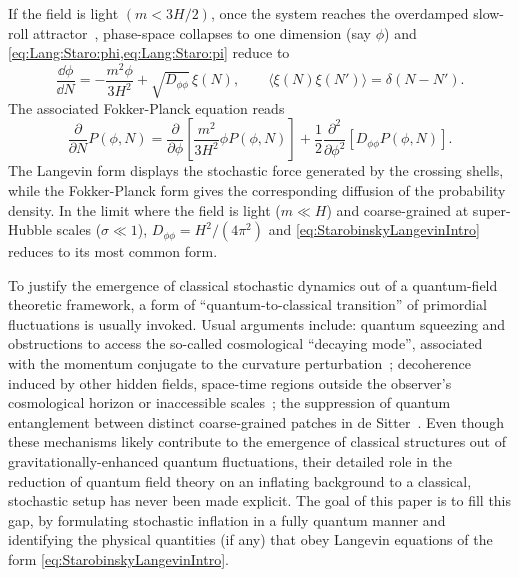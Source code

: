 \documentclass{article}
\numberwithin{equation}{section}
\begin{document}
If the field is light $(m<3H/2)$, once the system reaches the overdamped slow-roll attractor~\cite{grain2017stochastic}, phase-space collapses to one dimension (say $\phi$) and \cref{eq:Lang:Staro:phi,eq:Lang:Staro:pi} reduce to
	\begin{equation}
		\frac{\dd\phi}{\dd N} = -\frac{ m^2 \phi}{3H^2} +
        \sqrt{D_{\phi\phi}}
        \,\xi(N), \qquad \langle \xi(N)\xi(N')\rangle=\delta(N-N') .	\label{eq:StarobinskyLangevinIntro}
	\end{equation}
    The associated Fokker-Planck equation reads
	\begin{equation}
		\frac{\partial }{\partial N}P(\phi,N) = \frac{\partial}{\partial\phi}\!\left[\frac{{m^2}}{3H^2}\phi { P}(\phi,N) \right] +
        \frac{1}{2}
        \frac{\partial^2}{\partial\phi^2 }\!\left[D_{\phi\phi}P(\phi,N)\right].
		\label{eq:StarobinskyFPIntro}
	\end{equation}
	The Langevin form displays the stochastic force generated by the crossing shells, while the Fokker-Planck form gives the corresponding diffusion of the probability density. In the limit where the field is light ($m\ll H$) and coarse-grained at super-Hubble scales ($\sigma\ll 1$), $D_{\phi\phi}=H^2/(4\pi^2)$ and \cref{eq:StarobinskyLangevinIntro} reduces to its most common form.

	To justify the emergence of classical stochastic dynamics out of a quantum-field theoretic framework, a form of ``quantum-to-classical transition'' of primordial fluctuations is usually invoked. Usual arguments include: quantum squeezing and obstructions to access the so-called cosmological ``decaying mode'', associated with the momentum conjugate to the curvature perturbation~\cite{Polarski:1995jg, Kiefer:1998qe, Martin:2017zxs}; decoherence induced by other hidden fields, space-time regions outside the observer’s cosmological horizon or inaccessible scales~\cite{Brandenberger:1990bx, Lombardo:1995fg, Calzetta:1995ys, Lombardo:2005iz, Burgess:2006jn, Sharman:2007gi, Martin:2018zbe, Martin:2018lin, Martin:2021znx, Burgess:2022nwu}; the suppression of quantum entanglement between distinct coarse-grained patches in de Sitter~\cite{Martin:2021xml, Martin:2021qkg, Espinosa-Portales:2022yok, Agullo:2024cln, Ribes-Metidieri:2025nfw, Agullo:2025dxp}. Even though these mechanisms likely contribute to the emergence of classical structures out of gravitationally-enhanced quantum fluctuations, their detailed role in the reduction of quantum field theory on an inflating background to a classical, stochastic setup has never been made explicit. The goal of this paper is to fill this gap, by formulating stochastic inflation in a fully quantum manner and identifying the physical quantities (if any) that obey Langevin equations of the form \eqref{eq:StarobinskyLangevinIntro}.
\end{document}
